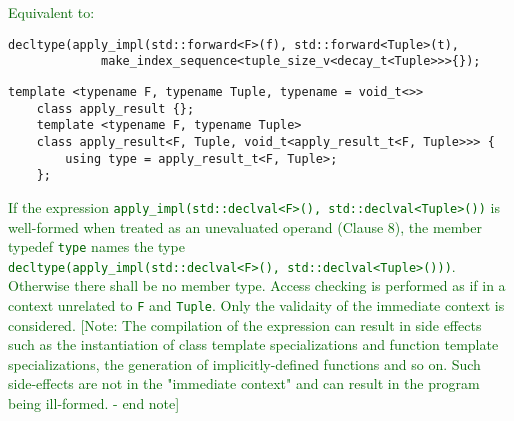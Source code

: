 \documentclass{article}
\begin{document}
\textcolor{darkgreen}{Equivalent to:}

\begin{lstlisting}[style=base]
    decltype(apply_impl(std::forward<F>(f), std::forward<Tuple>(t),
             make_index_sequence<tuple_size_v<decay_t<Tuple>>>{});
\end{lstlisting}

\begin{lstlisting}[style=base]
    template <typename F, typename Tuple, typename = void_t<>>
    class apply_result {};
    template <typename F, typename Tuple>
    class apply_result<F, Tuple, void_t<apply_result_t<F, Tuple>>> {
  	    using type = apply_result_t<F, Tuple>;
    };
\end{lstlisting}

\textcolor{darkgreen}{If the expression \texttt{apply\_impl(std::declval<F>(),
std::declval<Tuple>())} is well-formed when treated as an unevaluated operand
(Clause 8), the member typedef \texttt{type} names the type
\\\texttt{decltype(apply\_impl(std::declval<F>(), std::declval<Tuple>()))}.
Otherwise there shall be no member type.  Access checking is performed as if
in a context unrelated to \texttt{F} and \texttt{Tuple}.  Only the validaity
of the immediate context is considered.  [Note: The compilation of the
expression can result in side effects such as the instantiation of class
template specializations and function template specializations, the generation
of implicitly-defined functions and so on.  Such side-effects are not in the
"immediate context" and can result in the program being ill-formed.  - end
note]}
\end{document}
